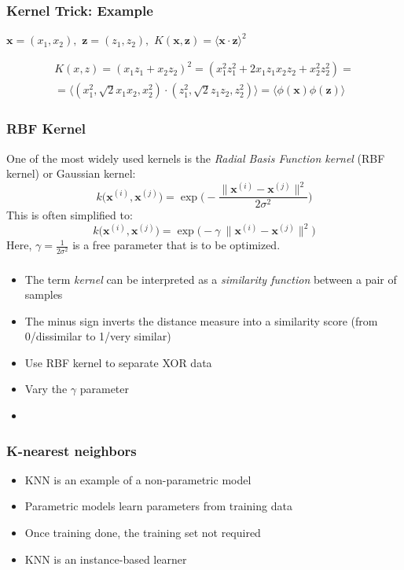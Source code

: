\documentclass{beamer}
\begin{document}
\begin{frame}
  \frametitle{Kernel Trick: Example}
  $\mathbf{x} = (x_1, x_2), $
  $\mathbf{z} = (z_1, z_2), $
  $K(\mathbf{x}, \mathbf{z}) = \langle \mathbf{x} \cdot \mathbf{z} \rangle^2$

  \begin{multline*}
  K(x, z) = (x_1z_1 + x_2z_2)^2 = (x_1^2z_1^2 + 2x_1z_1x_2z_2 + x_2^2z_2^2) = \\
  = \langle (x_1^2, \sqrt{2}x_1x_2, x_2^2) \cdot (z_1^2, \sqrt{2}z_1z_2, z_2^2) \rangle
  = \langle \phi(\mathbf{x}) \phi(\mathbf{z}) \rangle
  \end{multline*}

\end{frame}

\begin{frame}
  \frametitle{RBF Kernel}
  One of the most widely used kernels is the \textit{Radial Basis Function kernel} (RBF kernel) or Gaussian kernel:
  \[
  k \big( \mathbf{x}^{(i)}, \mathbf{x}^{(j)}  \big) = \exp \Bigg( - \frac{ \lVert \mathbf{x}^{(i)} - \mathbf{x}^{(j)} \rVert^2  }{2 \sigma^2} \Bigg)
  \]
  This is often simplified to:
  \[
  k \big( \mathbf{x}^{(i)}, \mathbf{x}^{(j)}  \big) = \exp \bigg(  -\gamma\ \lVert \mathbf{x}^{(i)} - \mathbf{x}^{(j)} \rVert^2  \bigg)
  \]
  Here, $\gamma = \frac{1}{2 \sigma^2}$ is a free parameter that is to be optimized.
\end{frame}

\begin{frame}
  \frametitle{}
  \begin{itemize}
  \item The term \textit{kernel} can be interpreted as a \textit{similarity function} between a pair of samples
  \item The minus sign inverts the distance measure into a similarity score (from 0/dissimilar to 1/very similar)
  \item Use RBF kernel to separate XOR data
  \item Vary the $\gamma$ parameter
  \item \href{https://github.com/rasbt/python-machine-learning-book/blob/master/code/ch03/ch03.ipynb}{}
  \end{itemize}
\end{frame}

\begin{frame}
  \frametitle{K-nearest neighbors}
  \begin{itemize}
  \item KNN is an example of a non-parametric model
  \item Parametric models learn parameters from training data
  \item Once training done, the training set not required
  \item KNN is an instance-based learner
  \end{itemize}
\end{frame}
\end{document}
